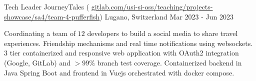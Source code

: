 

\begin{cventries}
\cventry
{Tech Leader} %
{JourneyTales 
({\tiny 
\href{https://gitlab.com/usi-si-oss/teaching/projects-showcase/sa4/team-4-pufferfish}{%
gitlab.com/usi-si-oss/teaching/projects-showcase/sa4/team-4-pufferfish}})} %
{Lugano, Switzerland} %
{Mar 2023 - Jun 2023} %
{ %
\begin{cvitems} %
\item {Coordinating a team of \( 12 \) developers to build a social media 
to share travel experiences. Friendship mechanisms and real time notifications using websockets.
3 tier containerized and responsive web application 
with OAuth2 integration (Google, GitLab)
and \( >99\% \) branch test coverage.
Containerized backend in Java Spring Boot and frontend in Vuejs 
orchestrated with docker compose.}
\end{cvitems}
}




\end{cventries}
